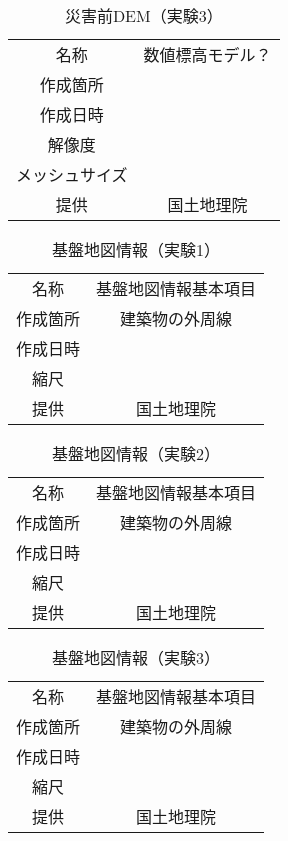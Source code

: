     \begin{table}[b]
      \centering
      \caption{災害前DEM（実験3）}
      \label{災害前DEM3}
      \begin{tabular}{cc}
        \hline
        名称 & 数値標高モデル？ \\
        作成箇所 &  \\
        作成日時 &  \\
        解像度 & \\
        メッシュサイズ &  \\
        提供 & 国土地理院 \\ \hline
      \end{tabular}
    \end{table}

    \begin{table}[b]
      \centering
      \caption{基盤地図情報（実験1）}
      \label{基盤地図情報1}
      \begin{tabular}{cc}
        \hline
        名称 & 基盤地図情報基本項目 \\
        作成箇所 & 建築物の外周線 \\
        作成日時 &  \\
        縮尺 & \\
        提供 & 国土地理院 \\ \hline
      \end{tabular}
    \end{table}


    \begin{table}[b]
      \centering
      \caption{基盤地図情報（実験2）}
      \label{基盤地図情報2}
      \begin{tabular}{cc}
        \hline
        名称 & 基盤地図情報基本項目 \\
        作成箇所 & 建築物の外周線 \\
        作成日時 &  \\
        縮尺 & \\
        提供 & 国土地理院 \\ \hline
      \end{tabular}
    \end{table}

    \begin{table}[b]
      \centering
      \caption{基盤地図情報（実験3）}
      \label{基盤地図情報3}
      \begin{tabular}{cc}
        \hline
        名称 & 基盤地図情報基本項目 \\
        作成箇所 & 建築物の外周線 \\
        作成日時 &  \\
        縮尺 & \\
        提供 & 国土地理院 \\ \hline
      \end{tabular}
    \end{table}


